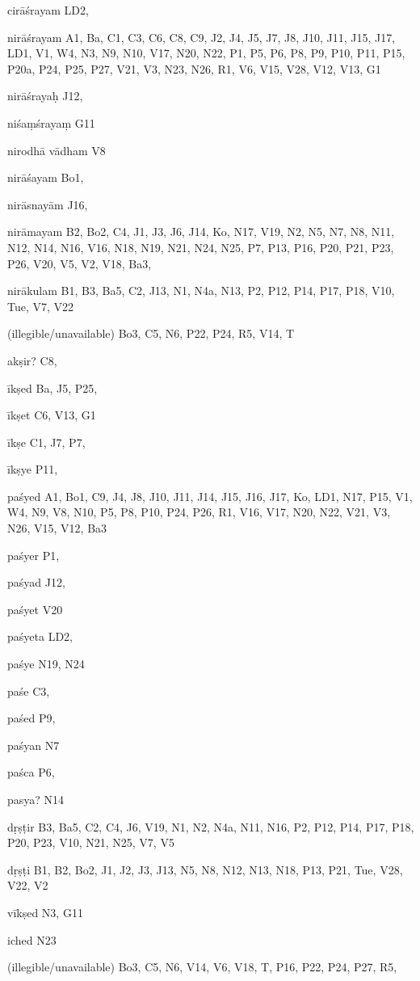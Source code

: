 \begin{marma}[hp02_009]
\begin{marma}[hp02_011]
 \begin{marma}[hp02_40b]
\item[cirāśrayam] LD2,
\item[nirāśrayam] A1, Ba, C1, C3, C6, C8, C9, J2, J4, J5, J7, J8, J10, J11, J15, J17, LD1, V1, W4, N3, N9, N10, V17, N20, N22, P1, P5, P6, P8, P9, P10, P11, P15, P20a, P24, P25, P27, V21, V3, N23, N26, R1, V6, V15, V28, V12, V13, G1
\item[nirāśrayaḥ] J12,
\item[niśaṃśrayaṃ] G11
\item[nirodhā vādham] V8
\item[nirāśayam] Bo1,
\item[nirāsnayām] J16,
\item[nirāmayam] B2, Bo2, C4, J1, J3, J6, J14, Ko, N17, V19, N2, N5, N7, N8, N11, N12, N14, N16, V16, N18, N19, N21, N24, N25, P7, P13, P16, P20, P21, P23, P26, V20, V5, V2, V18, Ba3,
\item[nirākulam] B1, B3, Ba5, C2, J13, N1, N4a, N13, P2, P12, P14, P17, P18, V10, Tue, V7, V22
\item[(illegible/unavailable)] Bo3, C5, N6, P22, P24, R5, V14, T
  \begin{description}

    \end{description}
 \end{marma}

 \begin{marma}[hp02_40c]
\item[akṣir?] C8,
\item[īkṣed] Ba, J5, P25,
\item[īkṣet] C6, V13, G1
\item[īkṣe] C1, J7, P7, 
\item[īkṣye] P11, 
\item[paśyed] A1, Bo1, C9, J4, J8, J10, J11, J14, J15, J16, J17, Ko, LD1, N17, P15, V1, W4, N9, V8, N10, P5, P8, P10, P24, P26, R1, V16, V17, N20, N22, V21, V3, N26, V15, V12, Ba3
\item[paśyer] P1,
\item[paśyad] J12,
\item[paśyet] V20
\item[paśyeta] LD2,
\item[paśye] N19, N24
\item[paśe] C3,
\item[paśed] P9, 
\item[paśyan] N7
\item[paśca] P6, 
\item[pasya?] N14  
\item[dṛṣṭir] B3, Ba5, C2, C4, J6, V19, N1, N2, N4a, N11, N16, P2, P12, P14, P17, P18, P20, P23, V10, N21, N25, V7, V5
\item[dṛṣṭi] B1, B2, Bo2, J1, J2, J3, J13, N5, N8, N12, N13, N18, P13, P21, Tue, V28, V22, V2 
\item[vīkṣed] N3, G11
\item[iched] N23
\item[(illegible/unavailable)] Bo3, C5, N6, V14, V6, V18, T, P16, P22, P24, P27, R5,
  \begin{description}


\end{description}
\end{marma}
\end{marma}
\end{marma}
